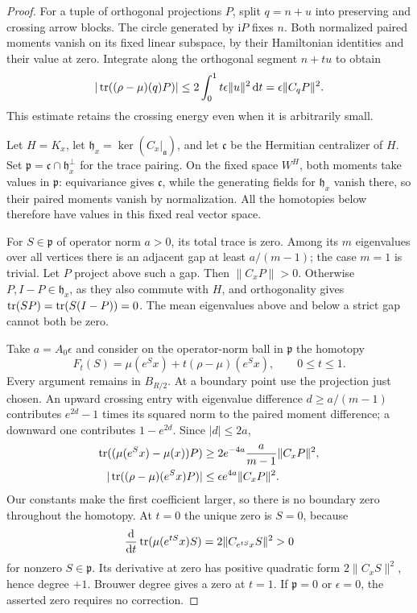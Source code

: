 \begin{proof}
For a tuple of orthogonal projections $P$, split $q=n+u$
into preserving and crossing arrow blocks. The circle
generated by $\mathrm iP$ fixes $n$. Both normalized
paired moments vanish on its fixed linear subspace, by
their Hamiltonian identities and their value at zero.
Integrate along the orthogonal segment $n+tu$ to obtain
\begin{equation}\label{eq:projection-relative-moment}
 |\operatorname{tr}((\rho-\mu)(q)P)|
 \le2\int_0^1t\epsilon\|u\|^2\,\mathrm d t
                        =\epsilon\|C_qP\|^2.
\end{equation}
This estimate retains the crossing energy even when it
is arbitrarily small.

Let $H=K_x$, let
$\mathfrak h_x=\ker(C_x|_{\mathfrak a})$, and let
$\mathfrak c$ be the Hermitian centralizer of $H$.
Set $\mathfrak p=\mathfrak c\cap\mathfrak h_x^\perp$
for the trace pairing. On the fixed space $W^H$, both
moments take values in $\mathfrak p$: equivariance gives
$\mathfrak c$, while the generating fields for
$\mathfrak h_x$ vanish there, so their paired moments
vanish by normalization. All the homotopies below
therefore have values in this fixed real vector space.

For $S\in\mathfrak p$ of operator norm $a>0$, its total
trace is zero. Among its $m$ eigenvalues over all vertices
there is an adjacent gap at least $a/(m-1)$; the case
$m=1$ is trivial. Let $P$ project above such a gap.
Then $\|C_xP\|>0$. Otherwise $P,I-P\in\mathfrak h_x$,
as they also commute with $H$, and orthogonality gives
$\operatorname{tr}(SP)=\operatorname{tr}(S(I-P))=0$. The mean eigenvalues above
and below a strict gap cannot both be zero.

Take $a=A_0\epsilon$ and consider on the operator-norm
ball in $\mathfrak p$ the homotopy
\[
 F_t(S)=\mu(e^Sx)+t(\rho-\mu)(e^Sx),\qquad0\le t\le1.
\]
Every argument remains in $B_{R/2}$.
At a boundary point use the projection just chosen.
An upward crossing entry with eigenvalue difference
$d\ge a/(m-1)$ contributes $e^{2d}-1$ times its
squared norm to the paired moment difference; a downward
one contributes $1-e^{2d}$. Since $|d|\le2a$,
\begin{equation}\label{eq:degree-boundary-estimate}
 \begin{aligned}
 \operatorname{tr}((\mu(e^Sx)-\mu(x))P)
    &\ge2e^{-4a}\frac{a}{m-1}\|C_xP\|^2,\\
 |\operatorname{tr}((\rho-\mu)(e^Sx)P)|
    &\le\epsilon e^{4a}\|C_xP\|^2.
 \end{aligned}
\end{equation}
Our constants make the first coefficient larger, so
there is no boundary zero throughout the homotopy.
At $t=0$ the unique zero is $S=0$, because
\[
 \frac{\mathrm d}{\mathrm d t}\operatorname{tr}(\mu(e^{tS}x)S)
                         =2\|C_{e^{tS}x}S\|^2>0
\]
for nonzero $S\in\mathfrak p$. Its derivative at zero
has positive quadratic form $2\|C_xS\|^2$, hence degree
$+1$. Brouwer degree gives a zero at $t=1$.
If $\mathfrak p=0$ or $\epsilon=0$, the asserted zero
requires no correction.


\end{proof}
